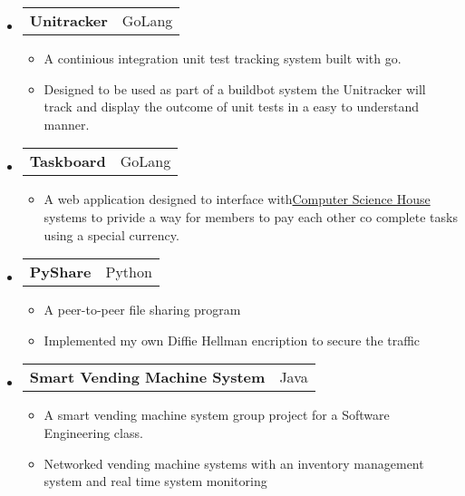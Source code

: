 \documentclass[letterpaper,11pt]{article}
\makeatletter
\newcommand{\restwosubheading}[2]{
\begin{tabular*}{6.5in}{l@{\extracolsep{\fill}}r}
		\textbf{#1} & #2 \\
\end{tabular*}\vspace{-6pt}}
\makeatother
\begin{document}
{\begin{itemize}
		\item 
		\restwosubheading{Unitracker }{GoLang}
			\begin{itemize}
				\item{A continious integration unit test tracking system built with go.}
                                \item{Designed to be used as part of a buildbot system the Unitracker will track and display the outcome of unit tests in a easy to understand manner.}
			\end{itemize}
		\item		
		\restwosubheading{Taskboard}{GoLang}
			\begin{itemize}
				\item{A web application designed to interface with{\href{http://csh.rit.edu}{Computer Science House} } systems to privide a way for members to pay each other co complete tasks using a special currency.} 
			\end{itemize}
		\item
		\restwosubheading{PyShare}{Python}
			\begin{itemize}
				\item{A peer-to-peer file sharing program}
                                \item{Implemented my own Diffie Hellman encription to secure the traffic}
			\end{itemize}
		\item		
		\restwosubheading{Smart Vending Machine System}{Java}
			\begin{itemize}
				\item{A smart vending machine system group project for a Software Engineering class.}
                                \item{Networked vending machine systems with an inventory management system and real time system monitoring}
			\end{itemize}
	\end{itemize}
}

\end{document}
